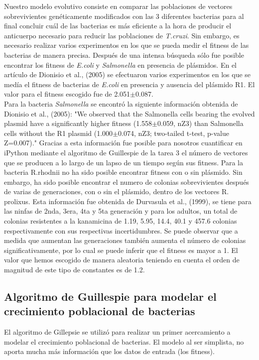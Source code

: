 \documentclass[12pt]{article}
\numberwithin{equation}{section}
\begin{document}
Nuestro modelo evolutivo consiste en comparar las poblaciones de vectores sobrevivientes genéticamente modificados con las 3 diferentes bacterias para al final concluir cuál de las bacterias es más eficiente a la hora de producir el anticuerpo necesario para reducir las poblaciones de \textit{T.cruzi}. Sin embargo, es necesario realizar varios experimentos en los que se pueda medir el fitness de las bacterias de manera precisa. Después de una intensa búsqueda sólo fue posible encontrar los fitness de \textit{E.coli} y \textit{Salmonella} en presencia de plásmidos. En el artículo de Dionisio et al., (2005) se efectuaron varios experimentos en los que se medía el fitness de bacterias de \textit{E.coli} en presencia y ausencia del plásmido R1. El valor para el fitness escogido fue de 2.051$\pm$0.087. \\
Para la bacteria \textit{Salmonella} se encontró la siguiente información obtenida de Dionisio et al., (2005): "We observed that the Salmonella cells bearing the evolved plasmid have a significantly higher fitness (1.558$\pm$0.059, nZ3) than Salmonella cells without the R1 plasmid (1.000$\pm$0.074, nZ3; two-tailed t-test, p-value Z=0.007)." Gracias a esta información fue posible para nosotros cuantificar en iPython mediante el algoritmo de Guillespie de la tarea 3 el número de vectores que se producen a lo largo de un lapso de un tiempo según sus fitness.
Para la bacteria R.rhodnii no ha sido posible encontrar fitness con o sin plásmido. Sin embargo, ha sido posible encontrar el numero de colonias sobrevivientes después de varias de generaciones, con o sin el plásmido, dentro de los vectores R. prolixus. Esta información fue obtenida de Durvasula et al., (1999), se tiene para las ninfas de 2nda, 3era, 4ta y 5ta generación y para los adultos, un total de colonias resistentes a la kanamicina de 1.19, 5.95, 14.4, 40.1 y 457.6  colonias respectivamente con sus respectivas incertidumbres. Se puede observar que a medida que aumentan las generaciones también aumenta el número de colonias significativamente, por lo cual se puede inferir que el fitness es mayor a 1. El valor que hemos escogido de manera aleatoria teniendo en cuenta el orden de magnitud de este tipo de constantes es de 1.2.

\subsection{Algoritmo de Guillespie para modelar el crecimiento poblacional de bacterias}

El algoritmo de Gillepsie se utilizó para realizar un primer acercamiento a modelar el crecimiento poblacional de bacterias. El modelo al ser simplista, no aporta mucha más información que los datos de entrada (los fitness). 
\end{document}
